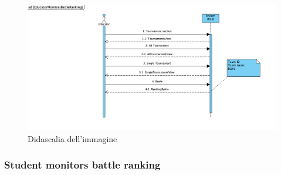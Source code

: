     \begin{figure}[H]
  \includegraphics[width=1\linewidth]{SequenceDiagram/EducatorMonitorsBattleRanking.png} 
  \caption{Didascalia dell'immagine}
  \label{fig:immagine}
\end{figure}
\subsubsection{Student monitors battle ranking}

